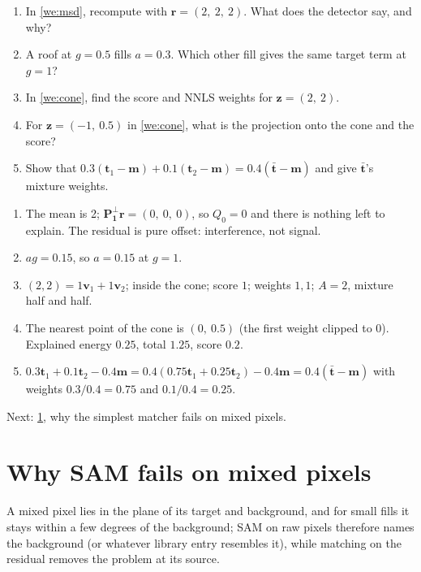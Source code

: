 \documentclass[11pt,a4paper,oneside,openany]{book}
\newcommand{\B}[1]{{\symbf{#1}}}
\newcommand{\B}[1]{{\bm{#1}}}
\newcommand{\vt}{\B{t}}
\newcommand{\vr}{\B{r}}
\newcommand{\vv}{\B{v}}
\newcommand{\vz}{\B{z}}
\newcommand{\vm}{\B{m}}
\newcommand{\vone}{\B{1}}
\newcommand{\mP}{\B{P}}
\newcommand{\nextchapter}[1]{\par\medskip\noindent\hfill\textsf{\small Next: #1}\par}
\begin{document}
\begin{checkyourself}
\begin{enumerate}
\item In \cref{we:msd}, recompute with $\vr=(2,\ 2,\ 2)$. What does the detector say, and why?
\item A roof at $g=0.5$ fills $a=0.3$. Which other fill gives the same target term at $g=1$?
\item In \cref{we:cone}, find the score and NNLS weights for $\vz=(2,\ 2)$.
\item For $\vz=(-1,\ 0.5)$ in \cref{we:cone}, what is the projection onto the cone and the score?
\item Show that $0.3(\vt_1-\vm)+0.1(\vt_2-\vm)=0.4(\bar{\vt}-\vm)$ and give $\bar{\vt}$'s mixture weights.
\end{enumerate}
\end{checkyourself}

\begin{answers}
\begin{enumerate}
\item The mean is 2; $\mP^\perp_{\vone}\vr=(0,\ 0,\ 0)$, so $Q_0=0$ and there is nothing left to explain. The residual is pure offset: interference, not
  signal.
\item $ag=0.15$, so $a=0.15$ at $g=1$.
\item $(2,2)=1\vv_1+1\vv_2$; inside the cone; score $1$; weights $1,1$; $A=2$, mixture half and half.
\item The nearest point of the cone is $(0,\ 0.5)$ (the first weight clipped to 0). Explained energy $0.25$, total $1.25$, score $0.2$.
\item $0.3\vt_1+0.1\vt_2-0.4\vm=0.4(0.75\vt_1+0.25\vt_2)-0.4\vm=0.4(\bar{\vt}-\vm)$ with weights $0.3/0.4=0.75$ and $0.1/0.4=0.25$.
\end{enumerate}
\end{answers}

\nextchapter{\cref{ch:sam}, why the simplest matcher fails on mixed pixels.}

\chapter{Why SAM fails on mixed pixels}
\label{ch:sam}

\begin{onething}
A mixed pixel lies in the plane of its target and background, and for small fills it stays within a few degrees of the background; SAM on raw pixels
therefore names the background (or whatever library entry resembles it), while matching on the residual removes the problem at its source.
\end{onething}
\end{document}
